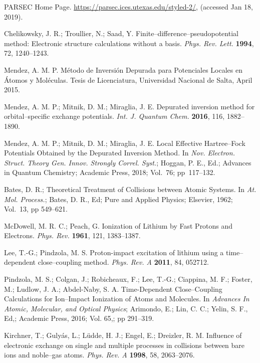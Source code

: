 \documentclass[10pt]{article}
\begin{document}
\begin{thebibliography}{10}

PARSEC Home Page. 
\url{https://parsec.ices.utexas.edu/styled-2/},
(accessed Jan 18, 2019).

Chelikowsky, J. R.; Troullier, N.; Saad, Y.
Finite--difference--pseudopotential method: Electronic structure calculations without a basis.
{\it Phys. Rev. Lett.} {\bf 1994}, 72, 1240--1243.

Mendez, A. M. P.
M\'etodo de Inversi\'on Depurada para Potenciales Locales en \'Atomos y Mol\'eculas.
Tesis de Licenciatura, Universidad Nacional de Salta, April 2015.

Mendez, A. M. P.; Mitnik, D. M.; Miraglia, J. E.
Depurated inversion method for orbital--specific exchange potentials.
{\it Int. J. Quantum Chem.} {\bf 2016}, 116, 1882--1890.

Mendez, A. M. P.; Mitnik, D. M.; Miraglia, J. E. 
Local Effective Hartree--Fock Potentials Obtained by the Depurated Inversion Method. 
In {\it Nov. Electron. Struct. Theory Gen. Innov. Strongly Correl. Syst.}; 
Hoggan, P. E., Ed.; 
Advances in Quantum Chemistry;
Academic Press, 2018;
Vol.~76; pp~117--132.

Bates, D. R.; 
Theoretical Treatment of Collisions between Atomic Systems.
In {\it At. Mol. Process.};
Bates, D. R., Ed;
Pure and Applied Physics;
Elsevier, 1962;
Vol.~13, pp 549--621.

McDowell, M. R. C.; Peach, G.
Ionization of Lithium by Fast Protons and Electrons.
{\it Phys. Rev.} {\bf 1961}, 121, 1383--1387.

Lee, T.-G.; Pindzola, M. S.
Proton-impact excitation of lithium using a time--dependent 
close--coupling method.
{\it Phys. Rev. A} {\bf 2011}, 84, 052712.

Pindzola, M. S.; Colgan, J.; Robicheaux, F.; Lee, T.-G.; Ciappina, M. F.;
Foster, M.; Ludlow, J. A.; Abdel-Naby,
 S. A.
Time-Dependent Close--Coupling Calculations for Ion--Impact Ionization 
of Atoms and Molecules. 
In {\it Advances In Atomic, Molecular, and Optical Physics};
Arimondo, E.; Lin, C. C.; Yelin,
 S. F., Ed,;
Academic Press,
 2016; Vol. 65,; pp 291--319.

Kirchner, T.; Guly\'as, L.; L\"udde, H. J.; Engel, E.; Dreizler, R. M. 
Influence of electronic exchange on single and multiple processes in 
collisions between bare ions and noble--gas atoms.
{\it Phys. Rev. A} {\bf 1998}, 58, 2063--2076.


\end{thebibliography}
\end{document}
